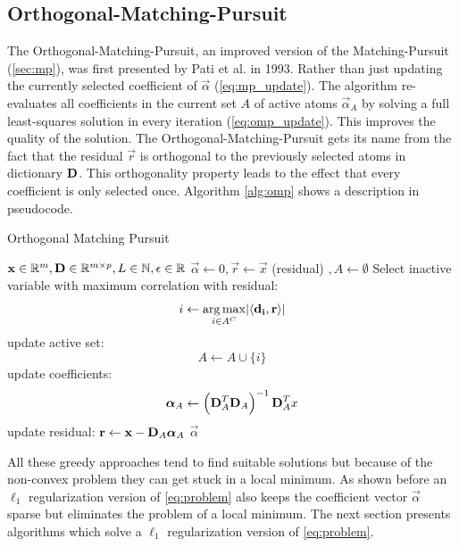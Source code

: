 \subsection{Orthogonal-Matching-Pursuit}
\label{sec:omp}
The Orthogonal-Matching-Pursuit, an improved version of
the Matching-Pursuit (\ref{sec:mp}), was first presented by Pati et al.
in 1993\cite{Pati1993}. Rather than just updating the currently selected
coefficient of $\vec{\alpha}$ (\ref{eq:mp_update}). The algorithm re-evaluates
all coefficients in the current set $A$ of active atoms $\vec{\alpha}_A$ by
solving a full least-squares solution in every iteration (\ref{eq:omp_update}).
This improves the quality of the solution\cite{Pati1993}. The
Orthogonal-Matching-Pursuit gets its name from the fact that the residual
$\vec{r}$ is orthogonal to the previously selected atoms in dictionary
$\boldsymbol{\mathrm{D}}$. This orthogonality property leads to the effect that every
coefficient is only selected once. Algorithm \ref{alg:omp} shows a
description in pseudocode.

\begin{algorithm}[H]
\caption{Orthogonal Matching Pursuit}
\label{alg:omp}
\begin{algorithmic}[1]
\REQUIRE $\boldsymbol{\mathrm{x}} \in \mathbb{R}^m, \boldsymbol{\mathrm{D}} \in \mathbb{R}^{m\times p}, L \in
\mathbb{N}, \epsilon \in \mathbb{R}$
\STATE $\vec{\alpha} \gets 0, \vec{r} \gets \vec{x} $ (residual) $, A \gets
\emptyset$
\STATE Select inactive variable with maximum correlation with residual: 
\begin{equation*}
i \gets \operatorname*{arg\,max}_{i \in A^C} \lvert \left<\boldsymbol{\mathrm{d_i}},\boldsymbol{\mathrm{r}}\right> \rvert
\end{equation*}
\STATE update active set:
\begin{equation*}
 A \gets A \cup \{i\} 
\end{equation*}
\STATE update coefficients: 
\begin{align}
\boldsymbol{\mathrm{\alpha}}_A \gets \left( \boldsymbol{\mathrm{D}}_A^T \boldsymbol{\mathrm{D}}_A \right)^{-1} \boldsymbol{\mathrm{D}}_A^T x 
\label{eq:omp_update}
\end{align}\label{alg:OMP_DTD}
\STATE update residual: $\boldsymbol{\mathrm{r}} \gets \boldsymbol{\mathrm{x}}-\boldsymbol{\mathrm{D}}_A\boldsymbol{\mathrm{\alpha}}_A$
\ENDFOR
\RETURN $\vec{\alpha}$
\end{algorithmic}
\end{algorithm}

All these greedy approaches tend to find suitable solutions but
because of the non-convex problem they can get stuck in a local minimum. As
shown before an $\ell_1$ regularization version of \ref{eq:problem} also keeps
the coefficient vector $\vec{\alpha}$ sparse but eliminates the problem of a
local minimum. The next section presents algorithms which solve  a $\ell_1$
regularization version of \ref{eq:problem}.


